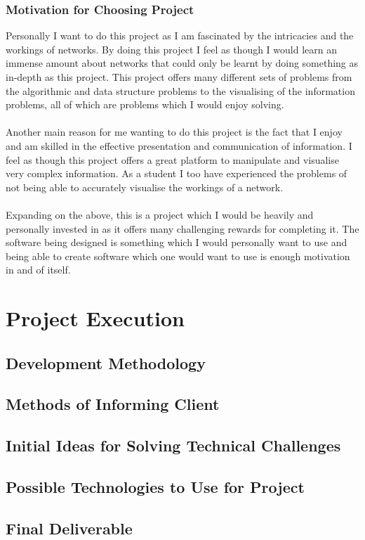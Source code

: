 \documentclass{article}
\begin{document}
		\subsubsection{Motivation for Choosing Project}
		Personally I want to do this project as I am fascinated by the intricacies and the workings of networks. By doing this project I feel as though I would learn an immense amount about networks that could only be learnt by doing something as in-depth as this project. This project offers many different sets of problems from the algorithmic and data structure problems to the visualising of the information problems, all of which are problems which I would enjoy solving.
\\\\		
		Another main reason for me wanting to do this project is the fact that I enjoy and am skilled in the effective presentation and communication of information. I feel as though this project offers a great platform to manipulate and visualise very complex information. As a student I too have experienced the problems of not being able to accurately visualise the workings of a network.
\\\\		
		Expanding on the above, this is a project which I would be heavily and personally invested in as it offers many challenging rewards for completing it. The software being designed is something which I would personally want to use and being able to create software which one would want to use is enough motivation in and of itself.

\cleardoublepage
    
\section{Project Execution}
	\subsection{Development Methodology}
		
	\subsection{Methods of Informing Client}
		
	\subsection{Initial Ideas for Solving Technical Challenges}
	\subsection{Possible Technologies to Use for Project}
	\subsection{Final Deliverable}
\end{document}
